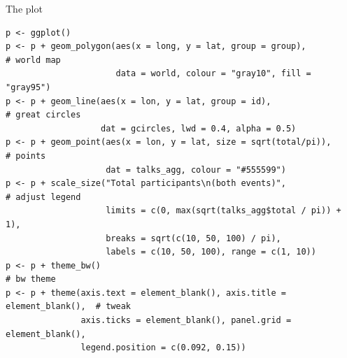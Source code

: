 \documentclass[sans,aspectratio=169,presentation,bigger,fleqn]{beamer}
\begin{document}
\begin{frame}[fragile,label=sec-19]{The plot}
 \scriptsize
\begin{verbatim}
p <- ggplot()
p <- p + geom_polygon(aes(x = long, y = lat, group = group),               # world map
                      data = world, colour = "gray10", fill = "gray95")
p <- p + geom_line(aes(x = lon, y = lat, group = id),                      # great circles
                   dat = gcircles, lwd = 0.4, alpha = 0.5)
p <- p + geom_point(aes(x = lon, y = lat, size = sqrt(total/pi)),          # points
                    dat = talks_agg, colour = "#555599")
p <- p + scale_size("Total participants\n(both events)",                   # adjust legend
                    limits = c(0, max(sqrt(talks_agg$total / pi)) + 1),
                    breaks = sqrt(c(10, 50, 100) / pi),
                    labels = c(10, 50, 100), range = c(1, 10))
p <- p + theme_bw()                                                        # bw theme
p <- p + theme(axis.text = element_blank(), axis.title = element_blank(),  # tweak
               axis.ticks = element_blank(), panel.grid = element_blank(),
               legend.position = c(0.092, 0.15))
\end{verbatim}
\normalsize
\end{frame}
\end{document}
